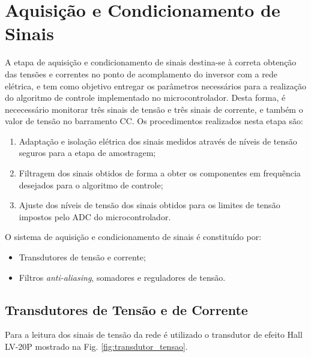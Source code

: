 \section{Aquisição e Condicionamento de Sinais}

A etapa de aquisição e condicionamento de sinais destina-se à correta obtenção das tensões e correntes no ponto de acomplamento do inversor com a rede elétrica, e tem como objetivo entregar os parâmetros necessários para a realização do algoritmo de controle implementado no microcontrolador.
Desta forma, é nececessário monitorar três sinais de tensão e três sinais de corrente, e também o valor de tensão no barramento CC.
Os procedimentos realizados nesta etapa são:
\begin{enumerate}
	\item Adaptação e isolação elétrica dos sinais medidos através de níveis de tensão seguros para a etapa de amostragem;
	\item Filtragem dos sinais obtidos de forma a obter os componentes em frequência desejados para o algoritmo de controle;
	\item Ajuste dos níveis de tensão dos sinais obtidos para os limites de tensão impostos pelo ADC do microcontrolador.
\end{enumerate}

O sistema de aquisição e condicionamento de sinais é constituído por:

\begin{itemize}
	\item Transdutores de tensão e corrente;
	\item Filtros \textit{anti-aliasing}, somadores e reguladores de tensão.
\end{itemize}

\subsection{Transdutores de Tensão e de Corrente}

Para a leitura dos sinais de tensão da rede é utilizado o transdutor de efeito Hall LV-20P mostrado na Fig. \ref{fig:transdutor_tensao}. 

